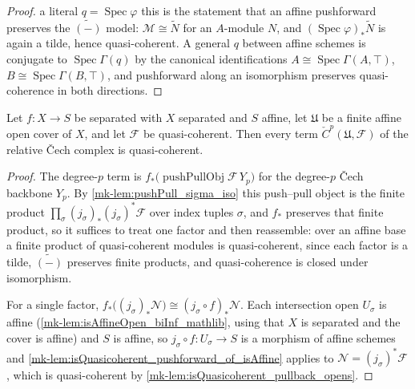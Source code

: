 \begin{proof}
  \leanokFor a literal \(q = \operatorname{Spec}\varphi\) this is the statement that an affine
  pushforward preserves the \(\widetilde{(-)}\) model: \(\mathcal{M} \cong \widetilde{N}\)
  for an \(A\)-module \(N\), and \((\operatorname{Spec}\varphi)_*\widetilde{N}\) is again a
  tilde, hence quasi-coherent. A general \(q\) between affine schemes is conjugate to
  \(\operatorname{Spec}\Gamma(q)\) by the canonical identifications
  \(A \cong \operatorname{Spec}\Gamma(A,\top)\), \(B \cong \operatorname{Spec}\Gamma(B,\top)\),
  and pushforward along an isomorphism preserves quasi-coherence in both directions.
\end{proof}

\begin{lemma}\label{mk-lem:isQuasicoherent_cechComplex_X}
  \leanok

  Let \(f : X \to S\) be separated with \(X\) separated and \(S\) affine, let
  \(\mathfrak{U}\) be a finite affine open cover of \(X\), and let \(\mathcal{F}\) be
  quasi-coherent. Then every term \(\check{C}^p(\mathfrak{U}, \mathcal{F})\) of the relative
  {\v C}ech complex is quasi-coherent.
\end{lemma}

\begin{proof}
  \leanok{}
  The degree-\(p\) term is \(f_*\bigl(\operatorname{pushPullObj}\mathcal{F}\,Y_p\bigr)\) for the
  degree-\(p\) {\v C}ech backbone \(Y_p\). By \ref{mk-lem:pushPull_sigma_iso} this push--pull object
  is the finite product \(\prod_\sigma (j_\sigma)_*(j_\sigma)^*\mathcal{F}\) over index tuples
  \(\sigma\), and \(f_*\) preserves that finite product, so it suffices to treat one factor and
  then reassemble: over an affine base a finite product of quasi-coherent modules is
  quasi-coherent, since each factor is a tilde, \(\widetilde{(-)}\) preserves finite products, and
  quasi-coherence is closed under isomorphism.

  For a single factor, \(f_*\bigl((j_\sigma)_* \mathcal{N}\bigr) \cong (j_\sigma \circ f)_*
  \mathcal{N}\). Each intersection open \(U_\sigma\) is affine
  (\ref{mk-lem:isAffineOpen_biInf_mathlib}, using that \(X\) is separated and the cover is affine)
  and \(S\) is affine, so \(j_\sigma \circ f : U_\sigma \to S\) is a morphism of affine schemes and
  \ref{mk-lem:isQuasicoherent_pushforward_of_isAffine} applies to
  \(\mathcal{N} = (j_\sigma)^*\mathcal{F}\), which is quasi-coherent by
  \ref{mk-lem:isQuasicoherent_pullback_opens}.
\end{proof}

